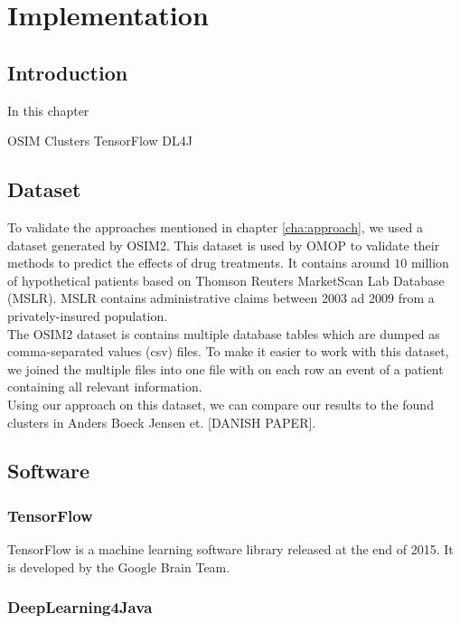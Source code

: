 \graphicspath{ {Implementation/Images/} }


\chapter{Implementation}
\label{cha:implementation}

\section{Introduction}
In this chapter 

OSIM
Clusters
TensorFlow
DL4J


\section{Dataset}

To validate the approaches mentioned in chapter \ref{cha:approach}, we used a dataset generated by OSIM2. This dataset is used by OMOP to validate their methods to predict the effects of drug treatments. It contains around $10$ million of hypothetical patients based on Thomson Reuters MarketScan Lab Database (MSLR). MSLR contains administrative claims between 2003 ad 2009 from a privately-insured population. \\

The OSIM2 dataset is contains multiple database tables which are dumped as comma-separated values (csv) files. To make it easier to work with this dataset, we joined the multiple files into one file with on each row an event of a patient containing all relevant information. \\

Using our approach on this dataset, we can compare our results to the found clusters in Anders Boeck Jensen et. [DANISH PAPER].


\section{Software}

\subsection{TensorFlow}

TensorFlow is a machine learning software library released at the end of 2015. It is developed by the Google Brain Team. \\




\subsection{DeepLearning4Java}

